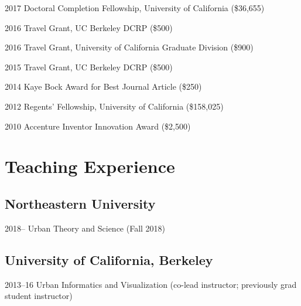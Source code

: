\documentclass{academiccv}
\begin{document}
\begin{tablist}
	
\item[2017] \tab Doctoral Completion Fellowship, University of California (\$36,655)

\item[2016] \tab Travel Grant, UC Berkeley DCRP (\$500)

\item[2016] \tab Travel Grant, University of California Graduate Division (\$900)

\item[2015] \tab Travel Grant, UC Berkeley DCRP (\$500)

\item[2014] \tab Kaye Bock Award for Best Journal Article (\$250)

\item[2012] \tab Regents' Fellowship, University of California (\$158,025)

\item[2010] \tab Accenture Inventor Innovation Award (\$2,500)

\end{tablist}



\section*{Teaching Experience}

\subsection*{Northeastern University}

\begin{tablist}
	
	\item[2018--]	\tab Urban Theory and Science (Fall 2018)
	
\end{tablist}

\subsection*{University of California, Berkeley}

\begin{tablist}
	
\item[2013--16]	\tab Urban Informatics and Visualization (co-lead instructor; previously grad student instructor)
	
\end{tablist}
\end{document}
